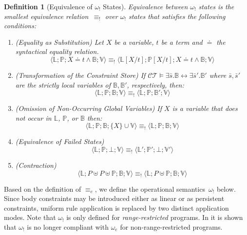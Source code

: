 \documentclass{tlp}
\newtheorem{definition}{Definition}[section]
\newcommand{\B}{\ensuremath{\mathbb{B}}}
\newcommand{\bL}{\ensuremath{\mathbb{L}}}
\newcommand{\bP}{\ensuremath{\mathbb{P}}}
\newcommand{\V}{\ensuremath{\mathbb{V}}}
\newcommand{\CT}{\ensuremath{\mathcal{CT}}}
\newcommand{\subXt}{\left[X/t\right] }
\newcommand{\Xet}{X\doteq t }
\newcommand{\bs}{{\bar s}}
\newcommand{\bang}{\ensuremath{!}}
\def\tuple#1{\langle #1 \rangle}
\newcommand{\stbang}[4]{\ensuremath{\tuple{#1; #2; #3; #4}}}
\newcommand{\obang}{\ensuremath{{\omega_\bang}}}
\newcommand{\ebang}{\ensuremath{\equiv_{\bang}}}
\newcommand{\eesq}{\ensuremath{\equiv_e}}
\begin{document}
\begin{definition}[Equivalence of $\obang$ States]
	\label{def:b:equiv}
Equivalence between $\obang$ states is the smallest equivalence
relation~$\ebang$ over $\obang$ states that satisfies the following
conditions:

\begin{enumerate}
\item \label{cond:b:subst} \emph{(Equality as Substitution)} Let $X$ be a
variable, $t$ be a term and $\doteq$ the syntactical equality relation.
\[
	\stbang{\bL}{\bP}{\Xet\wedge\B}{\V} \ebang
	\stbang{\bL\subXt}{\bP\subXt}{\Xet\wedge\B}{\V}
\]
\item \label{cond:b:ct} \emph{(Transformation of the Constraint Store)} If
$\CT\models\exists \bs.\B \leftrightarrow\exists\bar s'.\B'$ where $\bar s,
\bar s'$ are the strictly local variables of $\B,\B'$, respectively, then:
\[
	\stbang{\bL}{\bP}{\B}{\V} \ebang \stbang{\bL}{\bP}{\B'}{\V}
\]
\item \label{cond:b:global} \emph{(Omission of Non-Occurring Global Variables)}
If $X$ is a variable that does not occur in $\bL$, $\bP$, or $\B$ then:
\[
	\stbang{\bL}{\bP}{\B}{\{X\}\cup\V} \ebang \stbang{\bL}{\bP}{\B}{\V}
\]
\item \label{cond:b:fail} \emph{(Equivalence of Failed States)}
\[
	\stbang{\bL}{\bP}{\bot}{\V} \ebang \stbang{\bL'}{\bP'}{\bot}{\V'}
\]
\item \label{cond:b:cont} \emph{(Contraction)}
\[
	\stbang{\bL}{P\uplus P\uplus\bP}{\B}{\V} \ebang
	\stbang{\bL}{P\uplus\bP}{\B}{\V}
\]
\end{enumerate}
\end{definition}

Based on the definition of $\eesq$, we define the operational semantics~$\obang$
below. Since body constraints may be introduced either as linear or as persistent
constraints, uniform rule application is replaced by two distinct application
modes. Note that $\obang$ is only defined for \emph{range-restricted} programs.
In \cite{Betz2010} it is shown that $\obang$ is no longer compliant with
$\omega_e$ for non-range-restricted programs.
\end{document}
